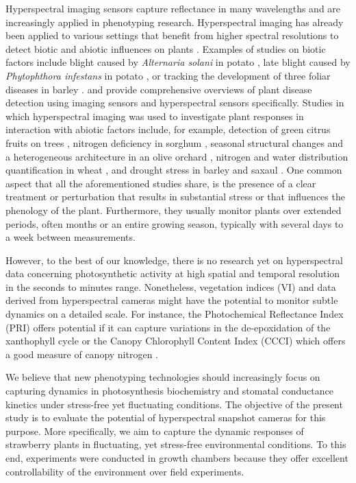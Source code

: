     Hyperspectral imaging sensors capture reflectance in many wavelengths and are increasingly applied in phenotyping research. Hyperspectral imaging has already been applied to various settings that benefit from higher spectral resolutions to detect biotic and abiotic influences on plants \citep{khanModern2018}. Examples of studies on biotic factors include blight caused by \textit{Alternaria solani} in potato \citep{vandevijverInfield2020}, late blight caused by \textit{Phytophthora infestans} in potato \citep{franceschiniFeasibility2019}, or tracking the development of three foliar diseases in barley \citep{wahabzadaPlant2016}. \citet{mahleinPlant2015} and \citet{loweHyperspectral2017} provide comprehensive overviews of plant disease detection using imaging sensors and hyperspectral sensors specifically. Studies in which hyperspectral imaging was used to investigate plant responses in interaction with abiotic factors include, for example, detection of green citrus fruits on trees \citep{okamotoGreen2009}, nitrogen deficiency in sorghum \citep{zhaoNitrogen2005}, seasonal structural changes and a heterogeneous architecture in an olive orchard \citep{zarco-tejadaSpatiotemporal2013}, nitrogen and water distribution quantification in wheat \citep{bruningDevelopment2019}, and drought stress in barley and saxaul \citep{behmannDetection2014,jinHyperspectral2016}. One common aspect that all the aforementioned studies share, is the presence of a clear treatment or perturbation that results in substantial stress or that influences the phenology of the plant. Furthermore, they usually monitor plants over extended periods, often months or an entire growing season, typically with several days to a week between measurements. 
    
    However, to the best of our knowledge, there is no research yet on hyperspectral data concerning photosynthetic activity at high spatial and temporal resolution in the seconds to minutes range. Nonetheless, vegetation indices (VI) and data derived from hyperspectral cameras might have the potential to monitor subtle dynamics on a detailed scale. For instance, the Photochemical Reflectance Index (PRI) offers potential if it can capture variations in the de-epoxidation of the xanthophyll cycle \citep{alonsoDiurnal2017} or the Canopy Chlorophyll Content Index (CCCI) which offers a good measure of canopy nitrogen \citep{barnesCoincident2000}. 
    
    We believe that new phenotyping technologies should increasingly focus on capturing dynamics in photosynthesis biochemistry and stomatal conductance kinetics under stress-free yet fluctuating conditions. The objective of the present study is to evaluate the potential of hyperspectral snapshot cameras for this purpose. More specifically, we aim to capture the dynamic responses of strawberry plants in fluctuating, yet stress-free environmental conditions. To this end, experiments were conducted in growth chambers because they offer excellent controllability of the environment over field experiments.